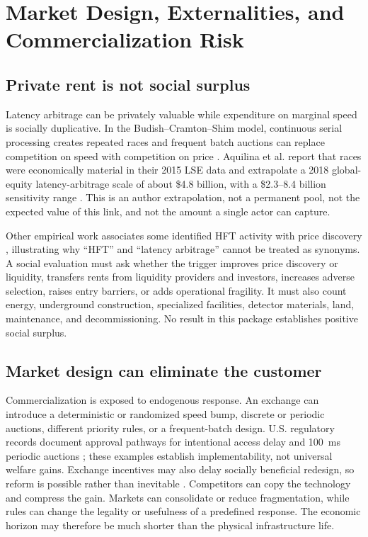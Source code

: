 \documentclass[11pt]{article}
\begin{document}
\section{Market Design, Externalities, and Commercialization Risk}

\subsection{Private rent is not social surplus}

Latency arbitrage can be privately valuable while expenditure on marginal speed is socially duplicative. In the Budish--Cramton--Shim model, continuous serial processing creates repeated races and frequent batch auctions can replace competition on speed with competition on price \citep{Budish2015}. Aquilina et al. report that races were economically material in their 2015 LSE data and extrapolate a 2018 global-equity latency-arbitrage scale of about \$4.8 billion, with a \$2.3--8.4 billion sensitivity range \citep{Aquilina2022}. This is an author extrapolation, not a permanent pool, not the expected value of this link, and not the amount a single actor can capture.

Other empirical work associates some identified HFT activity with price discovery \citep{Brogaard2014}, illustrating why ``HFT'' and ``latency arbitrage'' cannot be treated as synonyms. A social evaluation must ask whether the trigger improves price discovery or liquidity, transfers rents from liquidity providers and investors, increases adverse selection, raises entry barriers, or adds operational fragility. It must also count energy, underground construction, specialized facilities, detector materials, land, maintenance, and decommissioning. No result in this package establishes positive social surplus.

\subsection{Market design can eliminate the customer}

Commercialization is exposed to endogenous response. An exchange can introduce a deterministic or randomized speed bump, discrete or periodic auctions, different priority rules, or a frequent-batch design. U.S. regulatory records document approval pathways for intentional access delay and \SI{100}{\milli\second} periodic auctions \citep{SEC2016,SEC2021}; these examples establish implementability, not universal welfare gains. Exchange incentives may also delay socially beneficial redesign, so reform is possible rather than inevitable \citep{BudishLeeShim2024}. Competitors can copy the technology and compress the gain. Markets can consolidate or reduce fragmentation, while rules can change the legality or usefulness of a predefined response. The economic horizon may therefore be much shorter than the physical infrastructure life.
\end{document}

